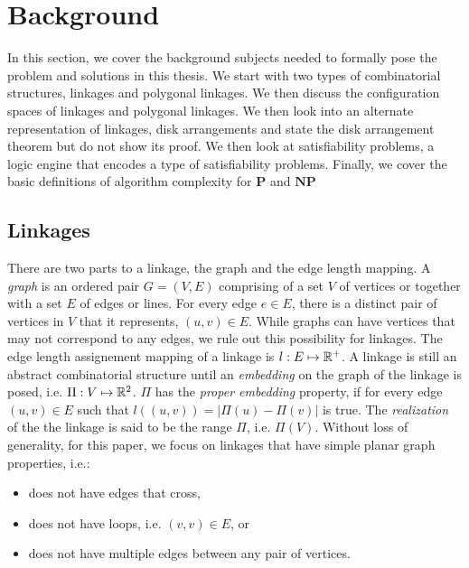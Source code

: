 \section{Background}
In this section, we cover the background subjects needed to formally pose the problem and solutions 
in this thesis.  We start with two types of combinatorial structures, linkages and polygonal 
linkages.  We then discuss the configuration spaces of linkages and polygonal linkages.   We then 
look into an alternate representation of linkages, disk arrangements and state the disk arrangement 
theorem but do not show its proof.  We then look at satisfiability problems, a logic engine that 
encodes a type of satisfiability problems.  Finally, we cover the basic definitions of algorithm 
complexity for $\textbf{P}$ and $\textbf{NP}$
\subsection{Linkages}
There are two parts to a linkage, the graph and the edge length mapping.   A \textit{graph} is an 
ordered pair $G = (V,E)$ comprising of a set $V$ of vertices or together with a set $E$ of edges or 
lines.  For every edge $e \in E$, there is a distinct pair of vertices in $V$ that it represents, 
$(u,v) \in E$.  While graphs can have vertices that may not correspond to any edges, we rule out 
this possibility for linkages.  The edge length assignement mapping of a linkage is $l: E \mapsto 
{\mathbb{R}}^+$. A linkage is still an abstract combinatorial structure until an \textit{embedding} on the 
graph of the linkage is posed, i.e. $\Pi : V \mapsto {\mathbb{R}}^{2}$. $\Pi$ has the \textit{proper 
embedding} property, if for every edge $(u,v) \in E$ such that $l\left( \left(u,v\right) \right) 
= \left\vert \Pi(u) - \Pi(v) \right\vert$ is true. The \textit{realization} of the the linkage is 
said to be the range $\Pi$, i.e. $\Pi(V)$.  Without loss of generality, for this paper, we focus on 
linkages that have simple planar graph properties, i.e.:
\begin{itemize}
\item[\rn{1}] does not have edges that cross,
\item[\rn{2}] does not have loops, i.e. $(v,v) \in E$, or
\item[\rn{3}] does not have multiple edges between any pair of vertices.
\end{itemize}  
